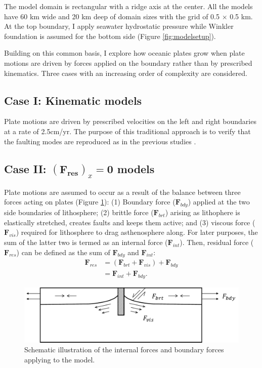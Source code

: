 \documentclass[letterpaper,12pt,notitle]{memphisthesis}                     %
\begin{document}
The model domain is rectangular with a ridge axis at the center. All the models have 60 km wide and 20 km deep of domain sizes with the grid of 0.5 $\times$ 0.5 km. At the top boundary, I apply seawater hydrostatic pressure while Winkler foundation is assumed for the bottom side (Figure \ref{fig:modelsetup}).

Building on this common basis, I explore how oceanic plates grow when plate motions are driven by forces applied on the boundary rather than by prescribed kinematics. Three cases with an increasing order of complexity are considered.

\subsection{Case I: Kinematic models}

Plate motions are driven by prescribed velocities on the left and right boundaries at a rate of 2.5cm/yr. The purpose of this traditional approach is to verify that the faulting modes are reproduced as in the previous studies \citep{Buck2005,Tucholke2008}.

\subsection{Case II: $(\boldsymbol{F_{res}})_x \mathbf{=0}$ models}

Plate motions are assumed to occur as a result of the balance between three forces acting on plates (Figure \ref{fig:forcescheme}): (1) Boundary force ($\mathbf{F}_{bdy}$) applied at the two side boundaries of lithosphere; (2) brittle force ($\boldsymbol{F}_{brt}$) arising as lithophere is elastically stretched, creates faults and keeps them active; %
and (3) viscous force ($\boldsymbol{F}_{vis}$) required for lithosphere to drag asthenosphere along. 
For later purposes, the sum of the latter two is termed as an internal force ($\boldsymbol{F}_{int}$). Then, residual force ($\boldsymbol{F}_{res}$) can be defined as the sum of $\boldsymbol{F}_{bdy}$ and $\boldsymbol{F}_{int}$:
%
\begin{align} \label{Fres}
\mathbf{F}_{res} & = (\mathbf{F}_{brt} + \mathbf{F}_{vis}) + \mathbf{F}_{bdy} \\
 & = \mathbf{F}_{int} + \mathbf{F}_{bdy}.
\end{align}
%
\begin{figure}[!htb]
	\centering
	\includegraphics[width=0.9\linewidth]{./figs/force.pdf}
	\caption{Schematic illustration of the internal forces and boundary forces applying to the model.}
	\label{fig:forcescheme}
\end{figure}
\end{document}
